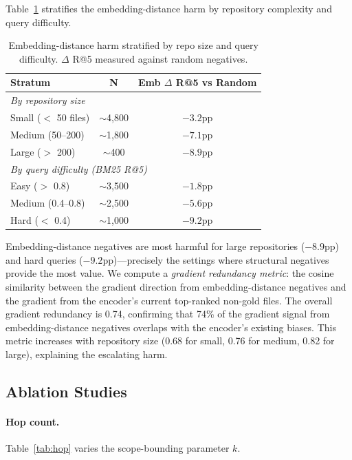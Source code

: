 \documentclass[11pt]{article}
\begin{document}
Table~\ref{tab:emb_harm} stratifies the embedding-distance harm by repository complexity and query difficulty.

\begin{table}[h]
\centering
\caption{Embedding-distance harm stratified by repo size and query difficulty. $\Delta$ R@5 measured against random negatives.}
\label{tab:emb_harm}
\small
\begin{tabular}{lcc}
\toprule
\textbf{Stratum} & \textbf{N} & \textbf{Emb $\Delta$ R@5 vs Random} \\
\midrule
\multicolumn{3}{l}{\emph{By repository size}} \\
\quad Small ($<$ 50 files)   & $\sim$4{,}800 & $-3.2$pp \\
\quad Medium (50--200)       & $\sim$1{,}800 & $-7.1$pp \\
\quad Large ($>$ 200)        & $\sim$400     & $-8.9$pp \\
\midrule
\multicolumn{3}{l}{\emph{By query difficulty (BM25 R@5)}} \\
\quad Easy ($>$ 0.8)         & $\sim$3{,}500 & $-1.8$pp \\
\quad Medium (0.4--0.8)      & $\sim$2{,}500 & $-5.6$pp \\
\quad Hard ($<$ 0.4)         & $\sim$1{,}000 & $-9.2$pp \\
\bottomrule
\end{tabular}
\end{table}

Embedding-distance negatives are most harmful for large repositories ($-8.9$pp) and hard queries ($-9.2$pp)---precisely the settings where structural negatives provide the most value.
We compute a \emph{gradient redundancy metric}: the cosine similarity between the gradient direction from embedding-distance negatives and the gradient from the encoder's current top-ranked non-gold files.
The overall gradient redundancy is 0.74, confirming that 74\% of the gradient signal from embedding-distance negatives overlaps with the encoder's existing biases.
This metric increases with repository size (0.68 for small, 0.76 for medium, 0.82 for large), explaining the escalating harm.

\subsection{Ablation Studies}

\paragraph{Hop count.}
Table~\ref{tab:hop} varies the scope-bounding parameter $k$.
\end{document}

